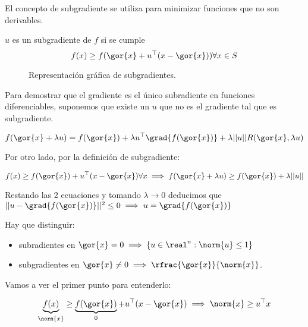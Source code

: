 \begin{problem}[10]
El concepto de subgradiente se utiliza para minimizar funciones que no son derivables.

\solution

\begin{defn}[Subgradiente]
$u$ es un subgradiente de $f$ si se cumple \[f(x) \geq f(\gor{x} + u^\top (x-\gor{x})) \forall x\in S\]
\end{defn}

\begin{figure}[hbtp]
\centering
{}
\caption{Representación gráfica de subgradientes.}
\end{figure}

\spart

\spart

Para demostrar que el gradiente es el único subradiente en funciones diferenciables, suponemos que existe un $u$ que no es el gradiente tal que es subgradiente.

\[
    f(\gor{x}+\lambda u) = f(\gor{x}) + \lambda u^\top \grad{f(\gor{x})} + \lambda ||u||R(\gor{x},\lambda u)
\]

Por otro lado, por la definición de subgradiente:

\[
    f(x) \geq f(\gor{x}) + u^\top (x-\gor{x}) \forall x \implies f(\gor{x} + \lambda u) \geq f(\gor{x}) + \lambda ||u||
\]

Restando las 2 ecuaciones y tomando $\lambda \to 0$ deducimos que $||u - \grad{f(\gor{x})}||^2 \leq 0 \implies u = \grad{f(\gor{x})}$

\spart

Hay que distinguir:
\begin{itemize}
 \item subradientes en $\gor{x} = 0 \implies \{u\in \real^n : \norm{u}\leq 1\}$
 \item subgradientes en $\gor{x} \neq 0\implies \rfrac{\gor{x}}{\norm{x}}$.
\end{itemize}

Vamos a ver el primer punto para entenderlo:

\[
    \underbrace{f(x)}_{\norm{x}}\geq \underbrace{f(\gor{x})}_{0} + u^\top (x-\gor{x}) \implies \norm{x} \geq u^\top x
\]


\end{problem}
